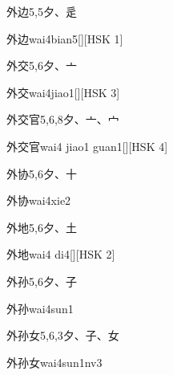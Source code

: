 \begin{entry}{外边}{5,5}{⼣、⾡}
  \begin{phonetics}{外边}{wai4bian5}[][HSK 1]
  \end{phonetics}
\end{entry}

\begin{entry}{外交}{5,6}{⼣、⼇}
  \begin{phonetics}{外交}{wai4jiao1}[][HSK 3]
  \end{phonetics}
\end{entry}

\begin{entry}{外交官}{5,6,8}{⼣、⼇、⼧}
  \begin{phonetics}{外交官}{wai4 jiao1 guan1}[][HSK 4]
  \end{phonetics}
\end{entry}

\begin{entry}{外协}{5,6}{⼣、⼗}
  \begin{phonetics}{外协}{wai4xie2}
  \end{phonetics}
\end{entry}

\begin{entry}{外地}{5,6}{⼣、⼟}
  \begin{phonetics}{外地}{wai4 di4}[][HSK 2]
  \end{phonetics}
\end{entry}

\begin{entry}{外孙}{5,6}{⼣、⼦}
  \begin{phonetics}{外孙}{wai4sun1}
  \end{phonetics}
\end{entry}

\begin{entry}{外孙女}{5,6,3}{⼣、⼦、⼥}
  \begin{phonetics}{外孙女}{wai4sun1nv3}
  \end{phonetics}
\end{entry}

